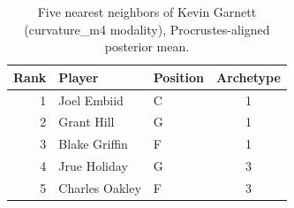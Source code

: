 \begin{table}[htbp]
  \centering\small
  \begin{tabular}{rllc}
    \toprule
    Rank & Player & Position & Archetype \\
    \midrule
    1 & Joel Embiid & C & 1 \\
    2 & Grant Hill & G & 1 \\
    3 & Blake Griffin & F & 1 \\
    4 & Jrue Holiday & G & 3 \\
    5 & Charles Oakley & F & 3 \\
    \bottomrule
  \end{tabular}
  \caption{Five nearest neighbors of Kevin Garnett (curvature_m4 modality), Procrustes-aligned posterior mean.}
  \label{tab:Kevin_Garnett_neighbors_curvature_m4}
\end{table}

